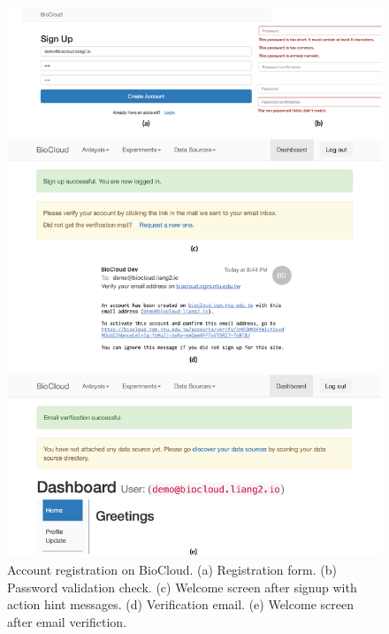\begin{figure}[!p]
\centering
\includegraphics[width=1\textwidth]{images/biocloud_signup}
\caption[Account registration on BioCloud]{
    Account registration on BioCloud.
    (a) Registration form.
    (b) Password validation check.
    (c) Welcome screen after signup with action hint messages.
    (d) Verification email.
    (e) Welcome screen after email verifiction.
}
\label{fig:biocloud-signup}
\end{figure}
